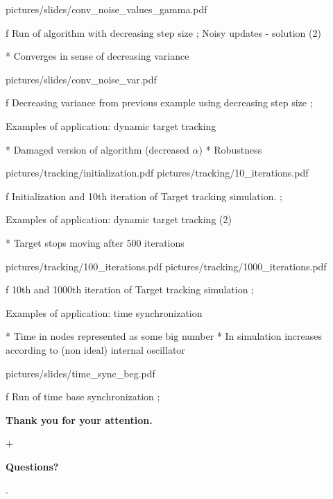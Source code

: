\centerline{\picw=14cm \inspic pictures/slides/conv_noise_values_gamma.pdf } 
\caption/f Run of algorithm with decreasing step size
\pg;
\sec Noisy updates - solution (2)


* Converges in sense of decreasing variance

\centerline{\picw=14cm \inspic pictures/slides/conv_noise_var.pdf } 
\caption/f Decreasing variance from previous example using decreasing step size
\pg;

\sec Examples of application: \nl dynamic target tracking

* Damaged version of algorithm (decreased $\alpha$)
* Robustness

\vskip 1cm

\picw=7.5cm
\centerline {\inspic pictures/tracking/initialization.pdf \hfil \inspic pictures/tracking/10_iterations.pdf }\nobreak
\caption/f Initialization and 10th iteration of Target tracking simulation.
\pg;

\sec Examples of application: \nl dynamic target tracking (2)

* Target stops moving after 500 iterations 

\vskip 1cm

\picw=7.5cm
\centerline {\inspic pictures/tracking/100_iterations.pdf \hfil \inspic pictures/tracking/1000_iterations.pdf }\nobreak
\caption/f 10th and 1000th iteration of Target tracking simulation
\pg;


\sec Examples of application: \nl time synchronization

* Time in nodes represented as some big number
* In simulation increases according to (non ideal) internal oscillator


\centerline{\picw=16cm \inspic pictures/slides/time_sync_beg.pdf } 
\caption/f Run of time base synchronization
\pg;



\null
\vskip2cm
\centerline{\typosize[35/40]\bf Thank you for your attention.}\pg+

\vskip2cm
\centerline{\Blue\typosize[60/70]\bf Questions?}

\pg. %

